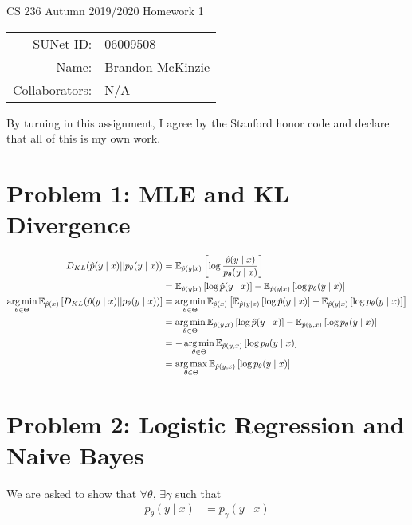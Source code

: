 \documentclass[11pt]{article}
\newcommand\p{\noindent}
\begin{document}
\begin{center}
	{\Large CS 236 Autumn 2019/2020 Homework 1}
	
	\begin{tabular}{rl}
		SUNet ID: & 06009508 \\
		Name: & Brandon McKinzie \\
		Collaborators: & N/A
	\end{tabular}
\end{center}

\p By turning in this assignment, I agree by the Stanford honor code and declare
that all of this is my own work.

\section*{Problem 1: MLE and KL Divergence}

\begin{align}
	D_{KL}(\hat p (y \mid x) || p_{\theta}(y \mid x))
		&= \E[\hat p (y \mid x)]{\log \frac{\hat p (y \mid x)}{p_{\theta}(y \mid x)}     } \\
		&= \E[\hat p (y \mid x)]{\log \hat p (y \mid x) } - \E[\hat p (y \mid x)]{\log p_{\theta}(y \mid x)   } \\
	\argmin_{\theta \in \Theta} \E[\hat p (x)]{D_{KL} (\hat p (y \mid x) || p_{\theta}(y \mid x))  }
		&= \argmin_{\theta \in \Theta} \E[\hat p (x)]{ 
			\E[\hat p (y \mid x)]{\log \hat p (y \mid x) } - \E[\hat p (y \mid x)]{\log p_{\theta}(y \mid x)   }
		}  \\
		&= \argmin_{\theta \in \Theta} 
		\E[\hat p (y,  x)]{\log \hat p (y \mid x) } - \E[\hat p (y,  x)]{\log p_{\theta}(y \mid x)   } \\
		&=  - \argmin_{\theta \in \Theta}  \E[\hat p (y,  x)]{\log p_{\theta}(y \mid x)   } \\
		&= \argmax_{\theta \in \Theta} \E[\hat p (y,  x)]{\log p_{\theta}(y \mid x)   }
\end{align}

\clearpage
\section*{Problem 2: Logistic Regression and Naive Bayes}

We are asked to show that $\forall \theta$, $\exists \gamma$ such that
\begin{align}
	p_{\theta}(y \mid x) &= p_{\gamma}(y \mid x)
\end{align}
\end{document}
